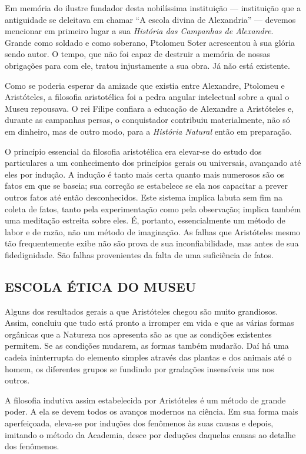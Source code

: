 \documentclass[11pt,a5paper,twoside,openany]{book}
\begin{document}
Em memória do ilustre fundador desta nobilíssima instituição — instituição que a antiguidade se deleitava em chamar “A escola divina de Alexandria” — devemos mencionar em primeiro lugar a sua \textit{História das Campanhas de Alexandre}. Grande como soldado e como soberano, Ptolomeu Soter acrescentou à sua glória sendo autor. O tempo, que não foi capaz de destruir a memória de nossas obrigações para com ele, tratou injustamente a sua obra. Já não está existente.

Como se poderia esperar da amizade que existia entre Alexandre, Ptolomeu e Aristóteles, a filosofia aristotélica foi a pedra angular intelectual sobre a qual o Museu repousava. O rei Filipe confiara a educação de Alexandre a Aristóteles e, durante as campanhas persas, o conquistador contribuiu materialmente, não só em dinheiro, mas de outro modo, para a \textit{História Natural} então em preparação.

O princípio essencial da filosofia aristotélica era elevar-se do estudo dos particulares a um conhecimento dos princípios gerais ou universais, avançando até eles por indução. A indução é tanto mais certa quanto mais numerosos são os fatos em que se baseia; sua correção se estabelece se ela nos capacitar a prever outros fatos até então desconhecidos. Este sistema implica labuta sem fim na coleta de fatos, tanto pela experimentação como pela observação; implica também uma meditação estreita sobre eles. É, portanto, essencialmente um método de labor e de razão, não um método de imaginação. As falhas que Aristóteles mesmo tão frequentemente exibe não são prova de sua inconfiabilidade, mas antes de sua fidedignidade. São falhas provenientes da falta de uma suficiência de fatos.

\subsection*{ESCOLA ÉTICA DO MUSEU}
Alguns dos resultados gerais a que Aristóteles chegou são muito grandiosos. Assim, concluiu que tudo está pronto a irromper em vida e que as várias formas orgânicas que a Natureza nos apresenta são as que as condições existentes permitem. Se as condições mudarem, as formas também mudarão. Daí há uma cadeia ininterrupta do elemento simples através das plantas e dos animais até o homem, os diferentes grupos se fundindo por gradações insensíveis uns nos outros.

A filosofia indutiva assim estabelecida por Aristóteles é um método de grande poder. A ela se devem todos os avanços modernos na ciência. Em sua forma mais aperfeiçoada, eleva-se por induções dos fenômenos às suas causas e depois, imitando o método da Academia, desce por deduções daquelas causas ao detalhe dos fenômenos.
\end{document}
